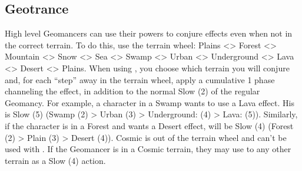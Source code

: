 \subsection*{Geotrance}\label{subsec:geo-trance}

\begin{multicols}{2}


High level Geomancers can use their powers to conjure effects even when not in the correct terrain. To do this, use the terrain wheel: Plains <> Forest <> Mountain <> Snow <> Sea <> Swamp <> Urban <> Underground <> Lava <> Desert <> Plains. When using , you choose which terrain you will conjure and, for each ``step'' away in the terrain wheel, apply a cumulative 1 phase channeling the effect, in addition to the normal Slow (2) of the regular Geomancy. For example, a character in a Swamp wants to use a Lava effect. His  is Slow (5) (Swamp (2) > Urban (3) > Underground: (4) > Lava: (5)). Similarly, if the character is in a Forest and wants a Desert effect,  will be Slow (4) (Forest (2) > Plain (3) > Desert (4)). Cosmic is out of the terrain wheel and can’t be used with . If the Geomancer is in a Cosmic terrain, they may use  to any other terrain as a Slow (4) action.


\begin{center}
\end{center}
\end{multicols}